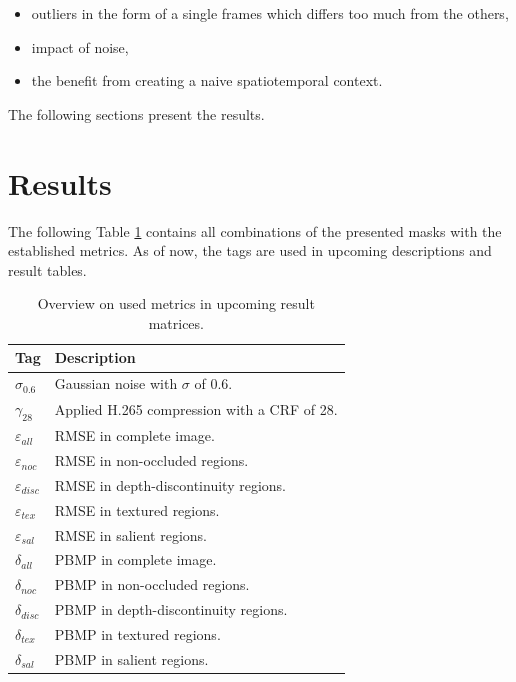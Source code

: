 \begin{itemize}
  \item outliers in the form of a single frames which differs too much from the others,
  \item impact of noise,
  \item the benefit from creating a naive spatiotemporal context.
\end{itemize}

\noindent The following sections present the results.

\newpage
\section{Results}

\noindent The following Table \ref{tab:metrics} contains all combinations of the presented masks with the established metrics.
As of now, the tags are used in upcoming descriptions and result tables.

\begin{table}[h!]
\centering
\begin{tabular}{l|l}
\textbf{Tag} & \textbf{Description} \\ \hline \hline
$\sigma_{0.6}$ & Gaussian noise with $\sigma$ of 0.6. \\ \hline
$\gamma_{28}$ & Applied H.265 compression with a CRF of 28. \\ \hline \hline
$\varepsilon_{all}$ & RMSE in complete image. \\ \hline
$\varepsilon_{noc}$ & RMSE in non-occluded regions. \\ \hline
$\varepsilon_{disc}$ & RMSE in depth-discontinuity regions. \\ \hline
$\varepsilon_{tex}$ & RMSE in textured regions. \\ \hline
$\varepsilon_{sal}$ & RMSE in salient regions. \\ \hline \hline
$\delta_{all}$ & PBMP in complete image. \\ \hline
$\delta_{noc}$ & PBMP in non-occluded regions. \\ \hline
$\delta_{disc}$ & PBMP in depth-discontinuity regions. \\ \hline
$\delta_{tex}$ & PBMP in textured regions. \\ \hline
$\delta_{sal}$ & PBMP in salient regions. \\ \hline
\end{tabular}
\caption{Overview on used metrics in upcoming result matrices.}
\label{tab:metrics}
\end{table}

